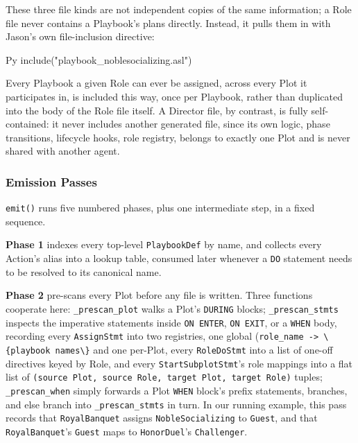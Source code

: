 These three file kinds are not independent copies of the same information; a Role file never contains a Playbook's plans directly. Instead, it pulls them in with Jason's own file-inclusion directive:
\begin{codeblock}[]{Py}
{ include("playbook_noblesocializing.asl") }
\end{codeblock}
Every Playbook a given Role can ever be assigned, across every Plot it participates in, is included this way, once per Playbook, rather than duplicated into the body of the Role file itself. A Director file, by contrast, is fully self-contained: it never includes another generated file, since its own logic, phase transitions, lifecycle hooks, role registry, belongs to exactly one Plot and is never shared with another agent.

\subsubsection{Emission Passes}
\lstinline|emit()| runs five numbered phases, plus one intermediate step, in a fixed sequence.

\textbf{Phase 1} indexes every top-level \lstinline|PlaybookDef| by name, and collects every Action's alias into a lookup table, consumed later whenever a \lstinline|DO| statement needs to be resolved to its canonical name.

\textbf{Phase 2} pre-scans every Plot before any file is written. Three functions cooperate here: \lstinline|_prescan_plot| walks a Plot's \lstinline|DURING| blocks; \lstinline|_prescan_stmts| inspects the imperative statements inside \lstinline|ON ENTER|, \lstinline|ON EXIT|, or a \lstinline|WHEN| body, recording every \lstinline|AssignStmt| into two registries, one global (\lstinline|role_name -> \{playbook names\}| and one per-Plot, every \lstinline|RoleDoStmt| into a list of one-off directives keyed by Role, and every \lstinline|StartSubplotStmt|'s role mappings into a flat list of \lstinline|(source Plot, source Role, target Plot, target Role)| tuples; \lstinline|_prescan_when| simply forwards a Plot \lstinline|WHEN| block's prefix statements, branches, and else branch into \lstinline|_prescan_stmts| in turn. In our running example, this pass records that \lstinline|RoyalBanquet| assigns \lstinline|NobleSocializing| to \lstinline|Guest|, and that \lstinline|RoyalBanquet|'s \lstinline|Guest| maps to \lstinline|HonorDuel|'s \lstinline|Challenger|.

